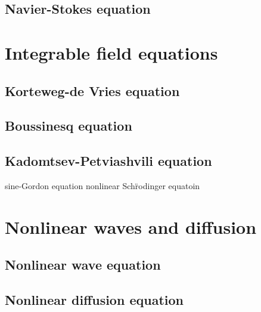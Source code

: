 \documentclass{../note}
\begin{document}
\section{Navier-Stokes equation}

\chapter{Integrable field equations}
\section{Korteweg-de Vries equation}
\section{Boussinesq equation}
\section{Kadomtsev-Petviashvili equation}

sine-Gordon equation
nonlinear Sch\"rodinger equatoin

\chapter{Nonlinear waves and diffusion}
\section{Nonlinear wave equation}
\section{Nonlinear diffusion equation}
\end{document}
